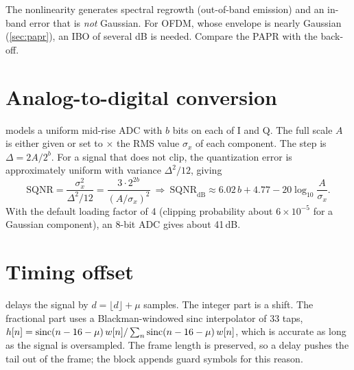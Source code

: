 \begin{pitfall}
The nonlinearity generates spectral regrowth (out-of-band emission) and an in-band error that
is \emph{not} Gaussian. For OFDM, whose envelope is nearly Gaussian (\cref{sec:papr}), an IBO
of several dB is needed. Compare the  PAPR with the back-off.
\end{pitfall}

\section{Analog-to-digital conversion}
 models a uniform mid-rise ADC with $b$ bits on each of I and Q. The full scale
$A$ is either given or set to $\times$ the RMS value $\sigma_x$ of each
component. The step is $\Delta=2A/2^b$. For a signal that does not clip, the quantization error is
approximately uniform with variance $\Delta^2/12$, giving
\begin{equation}
  \mathrm{SQNR}=\frac{\sigma_x^2}{\Delta^2/12}=\frac{3\cdot2^{2b}}{(A/\sigma_x)^2}
  \ \Rightarrow\ \mathrm{SQNR}_{\mathrm{dB}}\approx6.02\,b+4.77-20\log_{10}\frac{A}{\sigma_x}.
\end{equation}
With the default loading factor of 4 (clipping probability about $6\times10^{-5}$ for a Gaussian
component), an 8-bit ADC gives about 41\,dB.

\section{Timing offset}
 delays the signal by $d=\lfloor d\rfloor+\mu$ samples. The integer part is a
shift. The fractional part uses a Blackman-windowed sinc interpolator of 33 taps,
$h[n]=\operatorname{sinc}(n-16-\mu)\,w[n]/\sum_n\operatorname{sinc}(n-16-\mu)\,w[n]$, which is accurate as long as the signal
is oversampled. The frame length is preserved, so a delay pushes the tail out of the frame; the
 block appends guard symbols for this reason.
